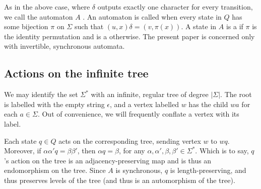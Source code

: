 \documentclass[11pt]{article}
\begin{document}
As in the above case, where $\delta$ outputs exactly one character for
every transition, we call the automaton $A$ . An
automaton is called  when every state in $Q$ has some
bijection $\pi$ on $\Sigma$ such that $(u, x)\delta = (v, \pi(x))$. A
state in $A$ is a  if $\pi$ is the identity
permutation and is a  otherwise. The present paper
is concerned only with invertible, synchronous automata.

\subsection{Actions on the infinite tree}

We may identify the set $\Sigma^*$ with an infinite, regular tree of
degree $|\Sigma|$. The root is labelled with the empty string
$\epsilon$, and a vertex labelled $w$ has the child $wa$ for each
$a \in \Sigma$. Out of convenience, we will frequently conflate a
vertex with its label.

\begin{center}
\end{center}

Each state $q \in Q$ acts on the corresponding tree, sending vertex
$w$ to $wq$. Moreover, if $\alpha \alpha' q = \beta \beta'$, then
$\alpha q = \beta$, for any
$\alpha, \alpha', \beta, \beta' \in \Sigma^*$. Which is to say, $q$'s
action on the tree is an adjacency-preserving map and is thus an
endomorphism on the tree. Since $A$ is synchronous, $q$ is
length-preserving, and thus preserves levels of the tree (and thus is
an automorphism of the tree).
\end{document}
